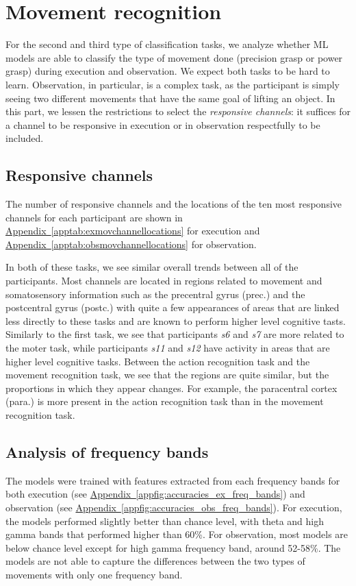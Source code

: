 \documentclass[10pt,conference,compsocconf]{IEEEtran}
\newcommand{\aref}[1]{\hyperref[#1]{Appendix~\ref*{#1}}}
\begin{document}
\section{Movement recognition}
\label{sec:objectrecognition}
For the second and third type of classification tasks, we analyze whether ML models are able to classify the type of movement done (precision grasp or power grasp) during execution and observation. We expect both tasks to be hard to learn. Observation, in particular, is a complex task, as the participant is simply seeing two different movements that have the same goal of lifting an object. In this part, we lessen the restrictions to select the \textit{responsive channels}: it suffices for a channel to be responsive in execution or in observation respectfully to be included.

\subsection{Responsive channels}
The number of responsive channels and the locations of the ten most responsive channels for each participant are shown in \aref{apptab:exmovchannellocations} for execution and \aref{apptab:obsmovchannellocations} for observation.

In both of these tasks, we see similar overall trends between all of the participants. Most channels are located in regions related to movement and somatosensory information such as the precentral gyrus (prec.)\cite{precentral_gyrus} and the postcentral gyrus (postc.)\cite{postcentral_gyrus} with quite a few appearances of areas that are linked less directly to these tasks and are known to perform higher level cognitive tasts. Similarly to the first task, we see that participants \textit{s6} and \textit{s7} are more related to the moter task, while participants \textit{s11} and \textit{s12} have activity in areas that are  higher level cognitive tasks. Between the action recognition task and the movement recognition task, we see that the regions are quite similar, but the proportions in which they appear changes. For example, the paracentral cortex (para.)\cite{paracentral} is more present in the action recognition task than in the movement recognition task.

\subsection{Analysis of frequency bands}
The models were trained with features extracted from each frequency bands for both execution (see \aref{appfig:accuracies_ex_freq_bands}) and observation (see \aref{appfig:accuracies_obs_freq_bands}). For execution, the models performed slightly better than chance level, with theta and high gamma bands that performed higher than 60\%. For observation, most models are below chance level except for high gamma frequency band, around 52-58\%. The models are not able to capture the differences between the two types of movements with only one frequency band.
\end{document}
